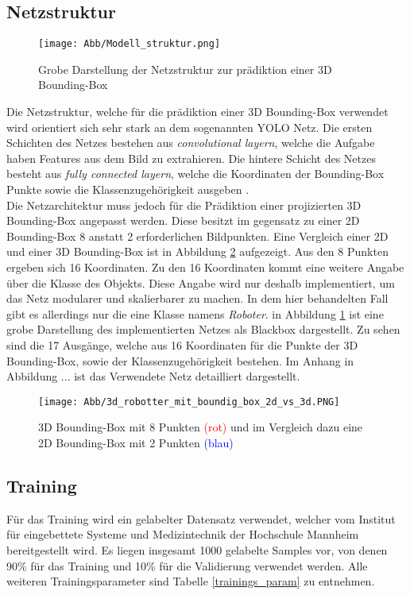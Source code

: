 \subsection{Netzstruktur}

\begin{figure}[!htb]
  \centering
  \texttt{[image: Abb/Modell\_struktur.png]}
  \caption{Grobe Darstellung der Netzstruktur zur prädiktion einer 3D Bounding-Box}
  \label{grobe_netz_struktur}
\end{figure} 

Die Netzstruktur, welche für die prädiktion einer 3D Bounding-Box verwendet wird orientiert sich sehr stark an dem sogenannten YOLO Netz. Die ersten Schichten des Netzes bestehen aus \textit{convolutional layern}, welche die Aufgabe haben Features aus dem Bild zu extrahieren. Die hintere Schicht des Netzes besteht aus  \textit{fully connected layern}, welche die Koordinaten der Bounding-Box Punkte sowie die Klassenzugehörigkeit  ausgeben \cite{Redmon2016}. \\Die Netzarchitektur muss jedoch für die Prädiktion einer projizierten 3D Bounding-Box angepasst werden. Diese besitzt im gegensatz zu einer 2D Bounding-Box 8 anstatt 2 erforderlichen Bildpunkten. Eine Vergleich einer 2D und einer 3D Bounding-Box ist in Abbildung \ref{3D_Bounding_roboter} aufgezeigt. Aus den 8 Punkten ergeben sich 16 Koordinaten. Zu den 16 Koordinaten kommt eine weitere Angabe über die Klasse des Objekts. Diese Angabe wird nur deshalb implementiert, um das Netz modularer und skalierbarer zu  machen. In dem hier behandelten Fall gibt es allerdings nur die eine Klasse namens \textit{Roboter}. in Abbildung \ref{grobe_netz_struktur} ist eine grobe Darstellung des implementierten Netzes als Blackbox dargestellt. Zu sehen sind die 17 Ausgänge, welche aus 16 Koordinaten für die Punkte der 3D Bounding-Box, sowie der Klassenzugehörigkeit bestehen. Im Anhang in Abbildung ... ist das Verwendete Netz detailliert dargestellt.

\begin{figure}[!htb]
  \centering
  \texttt{[image: Abb/3d\_robotter\_mit\_boundig\_box\_2d\_vs\_3d.PNG]}
  \caption{3D Bounding-Box mit 8 Punkten \textcolor{red}{(rot)} und im Vergleich dazu eine 2D Bounding-Box mit 2 Punkten \textcolor{blue}{(blau)} }
  \label{3D_Bounding_roboter}
\end{figure} 

\newpage
\subsection{Training}
Für das Training wird ein gelabelter Datensatz verwendet, welcher vom Institut für eingebettete Systeme und Medizintechnik der Hochschule Mannheim bereitgestellt wird. Es liegen insgesamt 1000 gelabelte Samples vor, von denen 90\% für das Training und 10\% für die Validierung verwendet werden. Alle weiteren Trainingsparameter sind Tabelle \ref{trainings_param} zu entnehmen.\\

